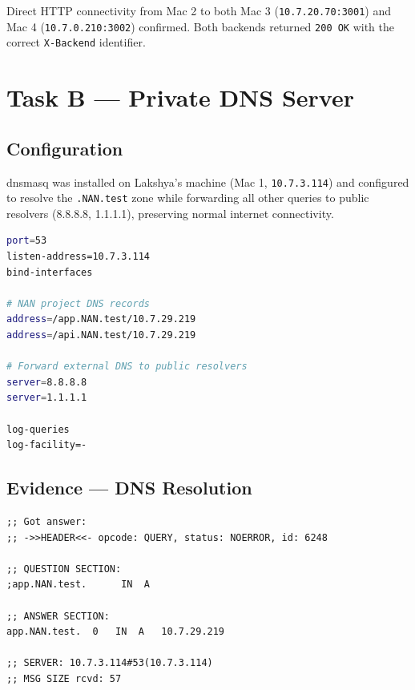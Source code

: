 \documentclass[12pt,a4paper]{article}
\begin{document}
\begin{successbox}[Result]
Direct HTTP connectivity from Mac 2 to both Mac 3 (\texttt{10.7.20.70:3001}) and Mac 4 (\texttt{10.7.0.210:3002}) confirmed. Both backends returned \texttt{200 OK} with the correct \texttt{X-Backend} identifier.
\end{successbox}

\section{Task B --- Private DNS Server}

\subsection{Configuration}

dnsmasq was installed on Lakshya's machine (Mac 1, \texttt{10.7.3.114}) and configured to resolve the \texttt{.NAN.test} zone while forwarding all other queries to public resolvers (8.8.8.8, 1.1.1.1), preserving normal internet connectivity.

\begin{lstlisting}[language=bash, caption=dns/dnsmasq.conf]
port=53
listen-address=10.7.3.114
bind-interfaces

# NAN project DNS records
address=/app.NAN.test/10.7.29.219
address=/api.NAN.test/10.7.29.219

# Forward external DNS to public resolvers
server=8.8.8.8
server=1.1.1.1

log-queries
log-facility=-
\end{lstlisting}

\subsection{Evidence --- DNS Resolution}

\begin{lstlisting}[caption=dig output for app.NAN.test]
;; Got answer:
;; ->>HEADER<<- opcode: QUERY, status: NOERROR, id: 6248

;; QUESTION SECTION:
;app.NAN.test.      IN  A

;; ANSWER SECTION:
app.NAN.test.  0   IN  A   10.7.29.219

;; SERVER: 10.7.3.114#53(10.7.3.114)
;; MSG SIZE rcvd: 57
\end{lstlisting}
\end{document}
